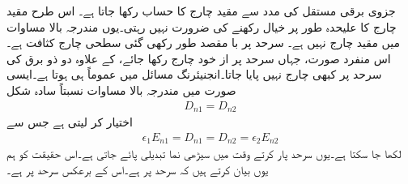 جزوی برقی مستقل کی مدد سے مقید چارج کا حساب رکھا جاتا ہے۔ اس طرح مقید چارج  کا علیحدہ طور پر  خیال رکھنے کی ضرورت نہیں رہتی۔یوں مندرجہ بالا مساوات میں  مقید چارج نہیں ہے۔  سرحد پر با مقصد طور   رکھی گئی سطحی چارج کثافت ہے۔اس منفرد  صورت، جہاں سرحد پر از خود چارج رکھا جائے،  کے علاوہ دو ذو برق کی سرحد پر کبھی چارج نہیں پایا جاتا۔انجنیئرنگ مسائل میں عموماً  ہی ہوتا ہے۔ایسی صورت میں مندرجہ بالا مساوات نسبتاً سادہ شکل 
\begin{align}\label{مساوات_کپیسٹر_عمودی_برقی_بہاو_مسلسل_ہے}
D_{n1} =D_{n2}
\end{align}
اختیار کر لیتی ہے جس سے
\begin{align}
\epsilon_{1} E_{n1}= D_{n1}=D_{n2}=\epsilon_2 E_{n2}
\end{align}
لکھا جا سکتا ہے۔یوں سرحد پار کرتے وقت  میں سیڑھی نما تبدیلی پائے جاتی ہے۔اس حقیقت کو ہم یوں بیان کرتے ہیں کہ سرحد پر   ہے۔اس کے برعکس  سرحد پر  ہے۔

